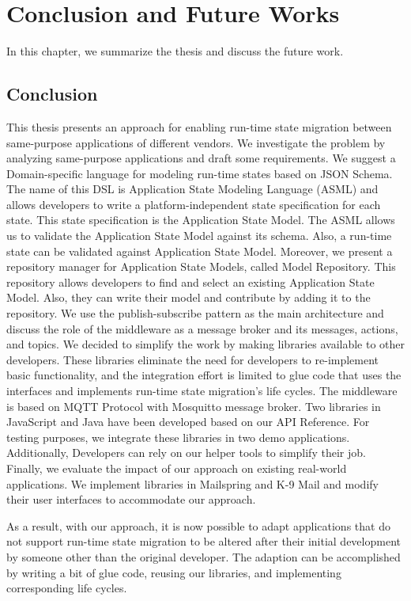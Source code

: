 \chapter{Conclusion and Future Works}
\label{ch:conclusion}
In this chapter, we summarize the thesis and discuss the future work.

\section{Conclusion}
This thesis presents an approach for enabling run-time state migration between same-purpose applications of different vendors. We investigate the problem by analyzing same-purpose applications and draft some requirements. We suggest a Domain-specific language for modeling run-time states based on JSON Schema. The name of this DSL is Application State Modeling Language (ASML) and allows developers to write a platform-independent state specification for each state. This state specification is the Application State Model. The ASML allows us to validate the Application State Model against its schema. Also, a run-time state can be validated against Application State Model.
Moreover, we present a repository manager for Application State Models, called Model Repository. This repository allows developers to find and select an existing Application State Model. Also, they can write their model and contribute by adding it to the repository. We use the publish-subscribe pattern as the main architecture and discuss the role of the middleware as a message broker and its messages, actions, and topics. We decided to simplify the work by making libraries available to other developers. These libraries eliminate the need for developers to re-implement basic functionality, and the integration effort is limited to glue code that uses the interfaces and implements run-time state migration's life cycles. The middleware is based on MQTT Protocol with Mosquitto message broker. Two libraries in JavaScript and Java have been developed based on our API Reference. For testing purposes, we integrate these libraries in two demo applications.
Additionally, Developers can rely on our helper tools to simplify their job. Finally, we evaluate the impact of our approach on existing real-world applications. We implement libraries in Mailspring and K-9 Mail and modify their user interfaces to accommodate our approach.

As a result, with our approach, it is now possible to adapt applications that do not support run-time state migration to be altered after their initial development by someone other than the original developer. The adaption can be accomplished by writing a bit of glue code, reusing our libraries, and implementing corresponding life cycles.


